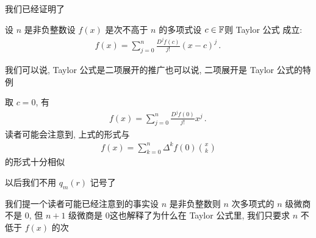 我们已经证明了

\begin{proposition}
    设 $n$ 是非负整数\period 设 $f(x)$ 是次不高于 $n$ 的多项式\period 设 $c \in \mathbb{F}$\period 则 Taylor 公式  成立:
    \begin{align*}
        f(x) = \sum_{j = 0}^{n} \frac{D^j f(c)}{j!} (x-c)^j \period
    \end{align*}
\end{proposition}

\begin{remark}
    我们可以说, Taylor 公式是二项展开的推广\period 也可以说, 二项展开是 Taylor 公式的特例\period
\end{remark}

\begin{remark}
    取 $c = 0$, 有
    \begin{align*}
        f(x) = \sum_{j = 0}^{n} \frac{D^j f(0)}{j!} x^j \period
    \end{align*}
    读者可能会注意到, 上式的形式与
    \begin{align*}
        f(x) = \sum_{k = 0}^{n} \Delta^k f(0) \binom{x}{k}
    \end{align*}
    的形式十分相似\period
\end{remark}

\begin{remark}
    以后我们不用 $q_m (r)$ 记号了\period
\end{remark}

\begin{remark}
    我们提一个读者可能已经注意到的事实\period 设 $n$ 是非负整数\period 则 $n$ 次多项式的 $n$ 级微商不是 $0$, 但 $n+1$ 级微商是 $0$\period 这也解释了为什么在 Taylor 公式里, 我们只要求 $n$ 不低于 $f(x)$ 的次\period
\end{remark}

